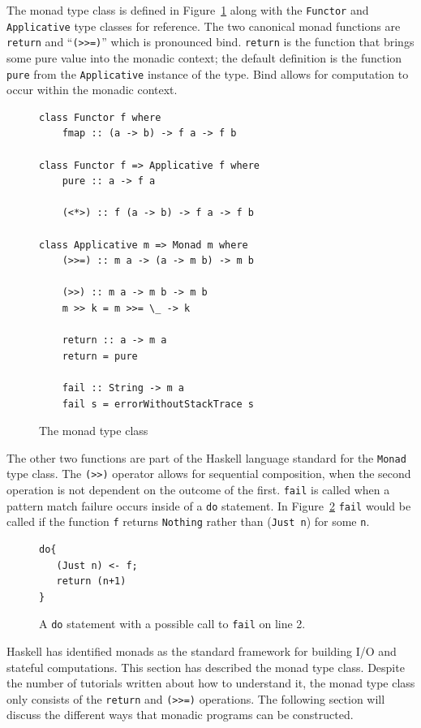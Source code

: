 The monad type class is defined in Figure~\ref{monadDef} along with the \texttt{Functor} and\\ \texttt{Applicative} type classes for reference. The two canonical monad functions are \texttt{return} and ``\texttt{(>>=)}'' which is pronounced bind. \texttt{return} is the function that brings some pure value into the monadic context; the default definition is the function \texttt{pure} from the \texttt{Applicative} instance of the type. Bind allows for computation to occur within the monadic context.

\begin{figure}[t]
\begin{lstlisting}
class Functor f where
	fmap :: (a -> b) -> f a -> f b

class Functor f => Applicative f where
	pure :: a -> f a
	
	(<*>) :: f (a -> b) -> f a -> f b

class Applicative m => Monad m where
	(>>=) :: m a -> (a -> m b) -> m b

	(>>) :: m a -> m b -> m b
	m >> k = m >>= \_ -> k
	
	return :: a -> m a
	return = pure
	
	fail :: String -> m a
	fail s = errorWithoutStackTrace s
\end{lstlisting}
\caption{The monad type class}
\label{monadDef}
\end{figure}

The other two functions are part of the Haskell language standard for the \texttt{Monad} type class. The \texttt{(>>)} operator allows for sequential composition, when the second operation is not dependent on the outcome of the first. \texttt{fail} is called when a pattern match failure occurs inside of a \texttt{do} statement. In Figure~\ref{failCall} \texttt{fail} would be called if the function \texttt{f} returns \texttt{Nothing} rather than (\texttt{Just n}) for some \texttt{n}.

\begin{figure}[t]
\begin{lstlisting}
do{
   (Just n) <- f;
   return (n+1)
}
\end{lstlisting}
\caption{A \texttt{do} statement with a possible call to \texttt{fail} on line 2.}
\label{failCall}
\end{figure}

Haskell has identified monads as the standard framework for building I/O and stateful computations. This section has described the monad type class. Despite the number of tutorials written about how to understand it, the monad type class only consists of the \texttt{return} and \texttt{(>>=)} operations. The following section will discuss the different ways that monadic programs can be constructed. 

